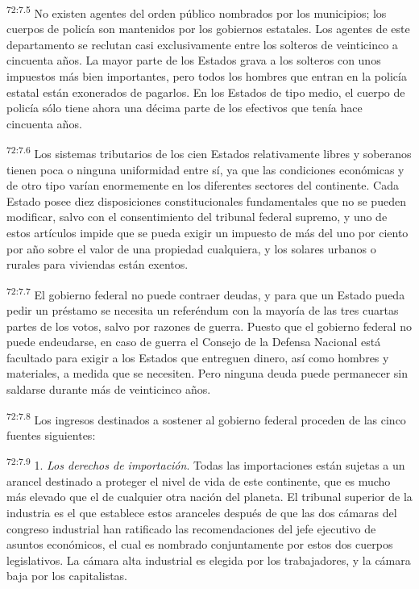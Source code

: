 \par
\textsuperscript{72:7.5} No existen agentes del orden público nombrados por los municipios; los cuerpos de policía son mantenidos por los gobiernos estatales. Los agentes de este departamento se reclutan casi exclusivamente entre los solteros de veinticinco a cincuenta años. La mayor parte de los Estados grava a los solteros con unos impuestos más bien importantes, pero todos los hombres que entran en la policía estatal están exonerados de pagarlos. En los Estados de tipo medio, el cuerpo de policía sólo tiene ahora una décima parte de los efectivos que tenía hace cincuenta años.

\par
\textsuperscript{72:7.6} Los sistemas tributarios de los cien Estados relativamente libres y soberanos tienen poca o ninguna uniformidad entre sí, ya que las condiciones económicas y de otro tipo varían enormemente en los diferentes sectores del continente. Cada Estado posee diez disposiciones constitucionales fundamentales que no se pueden modificar, salvo con el consentimiento del tribunal federal supremo, y uno de estos artículos impide que se pueda exigir un impuesto de más del uno por ciento por año sobre el valor de una propiedad cualquiera, y los solares urbanos o rurales para viviendas están exentos.

\par
\textsuperscript{72:7.7} El gobierno federal no puede contraer deudas, y para que un Estado pueda pedir un préstamo se necesita un referéndum con la mayoría de las tres cuartas partes de los votos, salvo por razones de guerra. Puesto que el gobierno federal no puede endeudarse, en caso de guerra el Consejo de la Defensa Nacional está facultado para exigir a los Estados que entreguen dinero, así como hombres y materiales, a medida que se necesiten. Pero ninguna deuda puede permanecer sin saldarse durante más de veinticinco años.

\par
\textsuperscript{72:7.8} Los ingresos destinados a sostener al gobierno federal proceden de las cinco fuentes siguientes:

\par
\textsuperscript{72:7.9} 1. \textit{Los derechos de importación}. Todas las importaciones están sujetas a un arancel destinado a proteger el nivel de vida de este continente, que es mucho más elevado que el de cualquier otra nación del planeta. El tribunal superior de la industria es el que establece estos aranceles después de que las dos cámaras del congreso industrial han ratificado las recomendaciones del jefe ejecutivo de asuntos económicos, el cual es nombrado conjuntamente por estos dos cuerpos legislativos. La cámara alta industrial es elegida por los trabajadores, y la cámara baja por los capitalistas.

